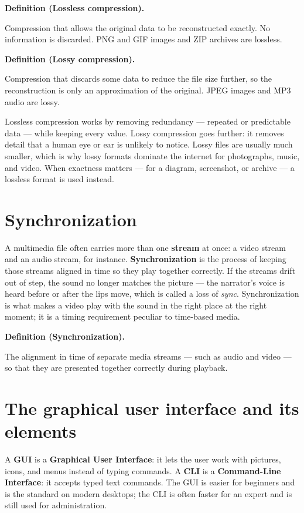 \documentclass[11pt]{article}
\newenvironment{definitionbox}[1]{%
  \par\noindent\textbf{Definition (#1).}\ \itshape
}{\par\vspace{0.3em}}
\begin{document}
\begin{definitionbox}{Lossless compression}
Compression that allows the original data to be reconstructed exactly. No
information is discarded. PNG and GIF images and ZIP archives are lossless.
\end{definitionbox}

\begin{definitionbox}{Lossy compression}
Compression that discards some data to reduce the file size further, so the
reconstruction is only an approximation of the original. JPEG images and MP3
audio are lossy.
\end{definitionbox}

Lossless compression works by removing redundancy --- repeated or predictable
data --- while keeping every value. Lossy compression goes further: it removes
detail that a human eye or ear is unlikely to notice. Lossy files are usually
much smaller, which is why lossy formats dominate the internet for
photographs, music, and video. When exactness matters --- for a diagram,
screenshot, or archive --- a lossless format is used instead.

\section{Synchronization}
A multimedia file often carries more than one \textbf{stream} at once: a video
stream and an audio stream, for instance. \textbf{Synchronization} is the
process of keeping those streams aligned in time so they play together
correctly. If the streams drift out of step, the sound no longer matches the
picture --- the narrator's voice is heard before or after the lips move, which
is called a loss of \emph{sync}. Synchronization is what makes a video play
with the sound in the right place at the right moment; it is a timing
requirement peculiar to time-based media.

\begin{definitionbox}{Synchronization}
The alignment in time of separate media streams --- such as audio and video
--- so that they are presented together correctly during playback.
\end{definitionbox}

\section{The graphical user interface and its elements}
A \textbf{GUI} is a \textbf{Graphical User Interface}: it lets the user work
with pictures, icons, and menus instead of typing commands. A \textbf{CLI} is
a \textbf{Command-Line Interface}: it accepts typed text commands. The GUI is
easier for beginners and is the standard on modern desktops; the CLI is often
faster for an expert and is still used for administration.
\end{document}
